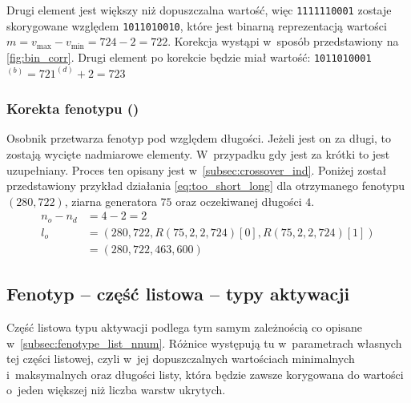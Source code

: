 Drugi element jest większy niż dopuszczalna wartość,
więc \texttt{1111110001} zostaje
skorygowane względem \texttt{1011010010},
które jest binarną reprezentacją wartości
$m=v_{\max}-v_{\min}=724-2=722$.
Korekcja wystąpi w~sposób przedstawiony
na \cref{fig:bin_corr}.
Drugi element po korekcie będzie miał wartość:
\texttt{1011010001}$\displaystyle
  {}^{\left(b\right)}
    =721^{\left(d\right)}+2
    =723
$

\tocless\subsubsection{%
  Korekta fenotypu
  ()%
}
Osobnik przetwarza fenotyp pod względem długości.
Jeżeli jest on za długi, to zostają
wycięte nadmiarowe elementy.
W~przypadku gdy jest za krótki to jest uzupełniany.
Proces ten opisany jest w~\cref{subsec:crossover_ind}.
Poniżej został przedstawiony przykład działania
\cref{eq:too_short_long} dla otrzymanego fenotypu
$\left(280, 722\right)$, ziarna generatora $75$
oraz oczekiwanej długości $4$.
$$
  \begin{aligned}
    n_o-n_d&=4-2=2\\
    l_o&=\left(
      280,
      722,
      {R\left(75, 2, 2, 724\right)}{\left[0\right]},
      {R\left(75, 2, 2, 724\right)}{\left[1\right]}
    \right)\\
      &=\left(280, 722, 463, 600\right)
  \end{aligned}
$$

\subsection{Fenotyp -- część listowa -- typy aktywacji}
\label{subsec:fenotype_list_tactiv}
Część listowa typu aktywacji podlega
tym samym zależnością co opisane
w~\cref{subsec:fenotype_list_nnum}.
Różnice występują tu w~parametrach
własnych tej części listowej,
czyli w~jej dopuszczalnych wartościach
minimalnych i~maksymalnych oraz długości listy,
która będzie zawsze korygowana do wartości
o~jeden większej niż liczba warstw ukrytych.

